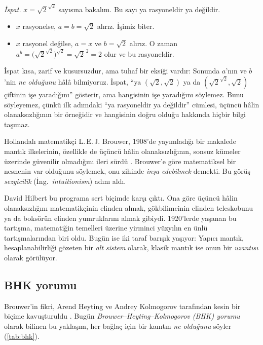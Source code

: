\noindent\textit{İspat.} $x = \sqrt{2}^{\sqrt{2}}$ sayısına bakalım.
Bu sayı ya rasyoneldir ya değildir.
\begin{itemize}
  \item $x$ rasyonelse, $a = b = \sqrt{2}$ alırız. İşimiz biter.
  \item $x$ rasyonel değilse, $a = x$ ve $b = \sqrt{2}$ alırız. O zaman
        $a^b = \bigl(\sqrt{2}^{\sqrt{2}}\bigr)^{\sqrt{2}} = \sqrt{2}^{\,2} = 2$
        olur ve bu rasyoneldir. \hfill\qedsymbol
\end{itemize}

İspat kısa, zarif ve kusursuzdur, ama tuhaf bir eksiği vardır: Sonunda
$a$'nın ve $b$'nin \emph{ne olduğunu} hâlâ bilmiyoruz. İspat, ``ya
$(\sqrt2, \sqrt2)$ ya da $(\sqrt2^{\sqrt2}, \sqrt2)$ çiftinin işe yaradığını''
gösterir, ama hangisinin işe yaradığını söylemez. Bunu söyleyemez, çünkü
ilk adımdaki ``ya rasyoneldir ya değildir'' cümlesi, üçüncü hâlin
olanaksızlığının bir örneğidir ve hangisinin doğru olduğu hakkında hiçbir
bilgi taşımaz.

\begin{tarihce}
Hollandalı matematikçi L.\,E.\,J. Brouwer, 1908'de yayımladığı bir
makalede mantık ilkelerinin, özellikle de üçüncü hâlin olanaksızlığının,
sonsuz kümeler üzerinde güvenilir olmadığını ileri sürdü
\citep{brouwer1908}. Brouwer'e göre matematiksel bir nesnenin var
olduğunu söylemek, onu zihinde \emph{inşa edebilmek} demekti. Bu görüş
\emph{sezgicilik} (İng.\ \emph{intuitionism}) adını aldı.

David Hilbert bu programa sert biçimde karşı çıktı. Ona göre üçüncü hâlin
olanaksızlığını matematikçinin elinden almak, gökbilimcinin elinden
teleskobunu ya da boksörün elinden yumruklarını almak gibiydi. 1920'lerde
yaşanan bu tartışma, matematiğin temelleri üzerine yirminci yüzyılın en
ünlü tartışmalarından biri oldu. Bugün ise iki taraf barışık
yaşıyor: Yapıcı mantık, hesaplanabilirliği gözeten bir \emph{alt sistem}
olarak, klasik mantık ise onun bir \emph{uzantısı} olarak görülüyor.
\end{tarihce}

\subsection{BHK yorumu}

Brouwer'in fikri, Arend Heyting ve Andrey Kolmogorov tarafından kesin bir
biçime kavuşturuldu \citep{heyting1930, kolmogorov1932}. Bugün
\emph{Brouwer--Heyting--Kolmogorov (BHK) yorumu} olarak bilinen bu
yaklaşım, her bağlaç için bir kanıtın \emph{ne olduğunu} söyler
(\cref{tab:bhk}).

